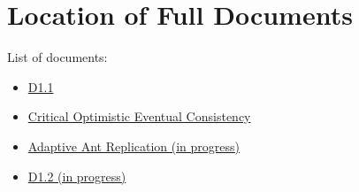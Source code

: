 \documentclass[12pt,twoside]{article}
\begin{document}
\section{Location of Full Documents}
List of documents:
\begin{itemize}
	\item \href{https://github.com/SyncFree/WP1/tree/master/D1_1/docs/wp1_D1.1_use_cases_in_natural_language.pdf}{D1.1}
	\item \href{https://github.com/SyncFree/WP1/blob/master/OCCSDoc/CriticalOptimisticEventualConsistency_0.1.pdf}{Critical Optimistic Eventual Consistency}
	\item \href{https://github.com/SyncFree/WP1/blob/master/AdaptiveReplication/docs/adaptiveAntReplication.pdf}{Adaptive Ant Replication (in progress)}
	\item \href{https://github.com/SyncFree/WP1/blob/master/D1.2/docs/D1_2.pdf}{D1.2 (in progress)}
\end{itemize}
%
\end{document}
